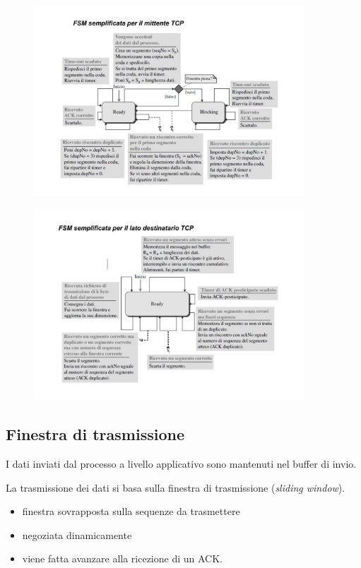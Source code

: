 \begin{figure}[H]
    \centering
    \includegraphics[width=0.9\textwidth]{immagini/FSMmittente.jpg}
\end{figure}

\begin{figure}[H]
    \centering
    \includegraphics[width=0.9\textwidth]{immagini/FSMdestinatario.jpg}
\end{figure}

\subsection{Finestra di trasmissione}

I dati inviati dal processo a livello applicativo sono mantenuti nel buffer di invio.

La trasmissione dei dati si basa sulla finestra di trasmissione (\emph{sliding window}).
\begin{itemize}
    \item finestra sovrapposta sulla sequenze da trasmettere
    \item negoziata dinamicamente
    \item viene fatta avanzare alla ricezione di un ACK.
\end{itemize}

